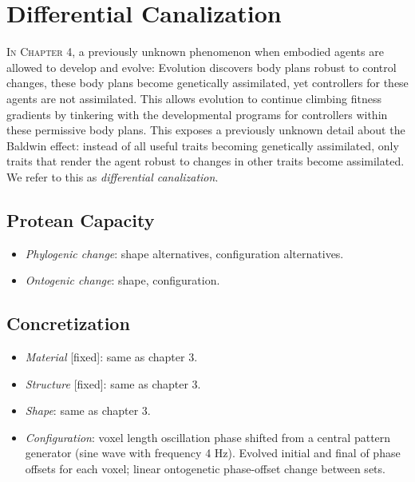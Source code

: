 \section{Differential Canalization}

\textsc{In Chapter 4,}
a previously unknown phenomenon when embodied agents are allowed to develop and evolve: Evolution discovers body plans robust to control changes, these body plans become genetically assimilated, yet controllers for these agents are not assimilated. 
This allows evolution to continue climbing fitness gradients by tinkering with the developmental programs for controllers within these permissive body plans. 
This exposes a previously unknown detail about the Baldwin effect: instead of all useful traits becoming genetically assimilated, only traits that render the agent robust to changes in other traits become assimilated. 
We refer to this as \textit{differential canalization}.


\subsection{Protean Capacity}

\begin{itemize}
    \item \textit{Phylogenic change}: shape alternatives, configuration alternatives.
    \item \textit{Ontogenic change}: shape, configuration.
\end{itemize}


\subsection{Concretization}

\begin{itemize}
    \item \textit{Material} [fixed]: same as chapter 3.
    \item \textit{Structure} [fixed]: same as chapter 3.
    \item \textit{Shape}: same as chapter 3.
    \item \textit{Configuration}: voxel length oscillation phase shifted from a central pattern generator (sine wave with frequency 4 Hz).
    Evolved initial and final of phase offsets for each voxel; linear ontogenetic phase-offset change between sets.
\end{itemize}





